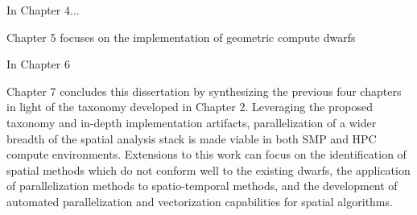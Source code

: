 In Chapter 4...

Chapter 5 focuses on the implementation of geometric compute dwarfs 

In Chapter 6

Chapter 7 concludes this dissertation by synthesizing the previous four chapters in light of the taxonomy developed in Chapter 2.  Leveraging the proposed taxonomy and in-depth implementation artifacts, parallelization of a wider breadth of the spatial analysis stack is made viable in both SMP and HPC compute environments.  Extensions to this work can focus on the identification of spatial methods which do not conform well to the existing dwarfs, the application of parallelization methods to spatio-temporal methods, and the development of automated parallelization and vectorization capabilities for spatial algorithms.